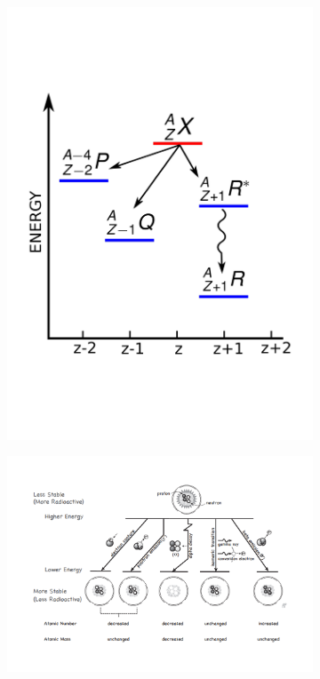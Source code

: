 \begin{figure}[!htbp]
\begin{subfigure}[t]{.49\textwidth}
\centering
\includegraphics[width=0.98\linewidth]{03_GraphicFiles/chapter1_Introduction/decayScheme.pdf}
\caption{}
\label{chap1::fig::decayScheme}
\end{subfigure}
\begin{subfigure}[t]{.49\textwidth}
\centering
\includegraphics[width=0.98\linewidth]{03_GraphicFiles/chapter1_Introduction/decaySchematicSimple.pdf}
\caption{}
\label{chap1::fig::nuclides}
\end{subfigure}
\caption{}
\label{chap1::fig::radioactiveDecay}
\end{figure} 

